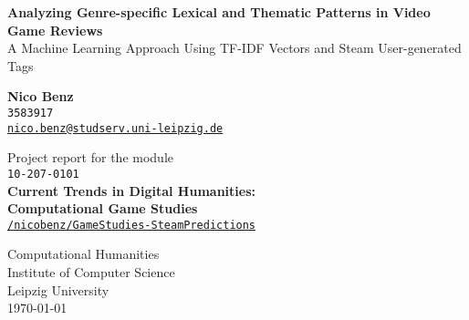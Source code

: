 \documentclass[11pt, a4paper]{article}
\begin{document}
\onehalfspacing

\begin{titlepage}
    \begin{center}
        \vspace*{1cm}
        \huge
        \textbf{Analyzing Genre-specific Lexical and Thematic Patterns in Video Game Reviews}\\
        A Machine Learning Approach Using TF-IDF Vectors and Steam User-generated Tags

        \vfill
        
        \LARGE   
        \textbf{Nico Benz}\\
        \texttt{3583917}\\
        \href{mailto:nico.benz@studserv.uni-leipzig.de}{\texttt{nico.benz@studserv.uni-leipzig.de}}
        
            
         \vfill
            
        Project report for the module\\
        \texttt{10-207-0101}\\
        \textbf{Current Trends in Digital Humanities:}\\
        \textbf{Computational Game Studies}\\
        
          \vfill
         \href{https://github.com/nicobenz/GameStudies-SteamPredictions}{\texttt{\faGithub{}/nicobenz/GameStudies-SteamPredictions}}
           
        
         \vfill   
        \Large
        Computational Humanities\\
        Institute of Computer Science\\
        Leipzig University\\
        \vspace{\baselineskip}
        \today
        
            
    \end{center}
\end{titlepage}
\end{document}
